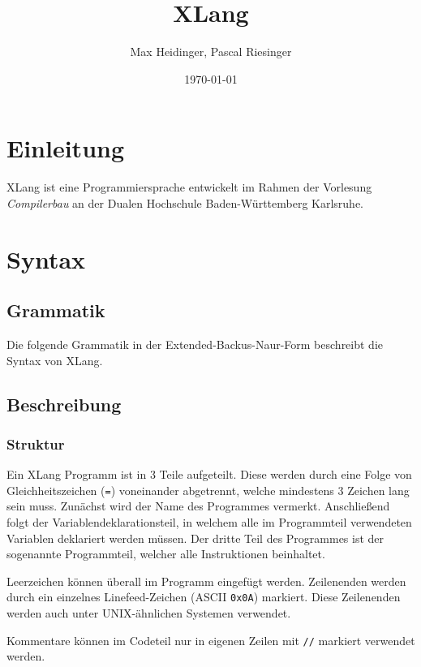 \documentclass[a4paper]{article}
\title{XLang}
\author{Max Heidinger, Pascal Riesinger}
\date{\today}
\begin{document}
\maketitle


\section{Einleitung}

XLang ist eine Programmiersprache entwickelt im Rahmen der Vorlesung \textit{Compilerbau} an der
Dualen Hochschule Baden-Württemberg Karlsruhe.

\section{Syntax}

\subsection{Grammatik}

Die folgende Grammatik in der Extended-Backus-Naur-Form beschreibt die Syntax von XLang.




\subsection{Beschreibung}

\subsubsection{Struktur}

Ein XLang Programm ist in 3 Teile aufgeteilt.
Diese werden durch eine Folge von Gleichheitszeichen (\texttt{=}) voneinander abgetrennt, welche
mindestens 3 Zeichen lang sein muss.
Zunächst wird der Name des Programmes vermerkt.
Anschließend folgt der Variablendeklarationsteil, in welchem alle im Programmteil verwendeten
Variablen deklariert werden müssen.
Der dritte Teil des Programmes ist der sogenannte Programmteil, welcher alle Instruktionen
beinhaltet.

Leerzeichen können überall im Programm eingefügt werden. Zeilenenden werden durch
ein einzelnes Linefeed-Zeichen (ASCII \texttt{0x0A}) markiert. Diese Zeilenenden werden auch unter
UNIX-ähnlichen Systemen verwendet.

Kommentare können im Codeteil nur in eigenen Zeilen mit \texttt{//} markiert verwendet werden.
\end{document}
